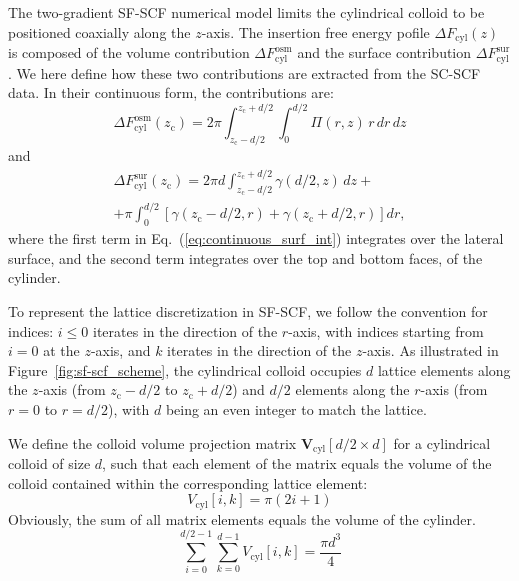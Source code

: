 \documentclass[10pt, a4paper]{article}
\begin{document}
\begin{multicols}{2}

The two-gradient SF-SCF numerical model limits the cylindrical colloid to be positioned coaxially along the $z$-axis.
The insertion free energy pofile $\Delta F_{\text{cyl}}(z)$ is composed of the volume contribution $\Delta F_{\text{cyl}}^{\text{osm}}$ and the surface contribution $\Delta F_{\text{cyl}}^{\text{sur}}$.
We here define how these two contributions are extracted from the SC-SCF data.
In their continuous form, the contributions are:
\begin{equation}
    \Delta F_{\text{cyl}}^{\text{osm}}(z_{\text{c}}) = 2 \pi \int_{z_{\text{c}} - d/2}^{z_{\text{c}} + d/2} \int_{0}^{d/2} \Pi(r,z) \, r \, dr \, dz
\end{equation}
and
\begin{equation}\label{eq:continuous_surf_int}
    \begin{aligned}
        \Delta F_{\text{cyl}}^{\text{sur}}(z_{\text{c}}) = 2 \pi d \int_{z_{\text{c}} - d/2}^{z_{\text{c}} + d/2} \gamma(d/2,z) \, dz +\\
        + \pi \int_{0}^{d/2} \left[ \gamma(z_{\text{c}} - d/2, r) + \gamma(z_{\text{c}} + d/2,r) \right] dr,
    \end{aligned}
\end{equation}
where the first term in Eq.~(\ref{eq:continuous_surf_int}) integrates over the lateral surface, and the second term integrates over the top and bottom faces, of the cylinder.

To represent the lattice discretization in SF-SCF, we follow the convention for indices: $i \le 0$ iterates in the direction of the $r$-axis, with indices starting from $i=0$ at the $z$-axis, and $k$ iterates in the direction of the $z$-axis.
As illustrated in Figure~\ref{fig:sf-scf_scheme}, the cylindrical colloid occupies $d$ lattice elements along the $z$-axis (from $z_{\text{c}} - d/2$ to $z_{\text{c}} + d/2$) and $d/2$ elements along the $r$-axis (from $r = 0$ to $r = d/2$), with $d$ being an even integer to match the lattice.

We define the colloid volume projection matrix $\bm{V}_{\text{cyl}}[d/2 \times d]$ for a cylindrical colloid of size $d$, such that each element of the matrix equals the volume of the colloid contained within the corresponding lattice element:
\begin{equation}
    V_{\text{cyl}}[i, k] = \pi(2i + 1)
\end{equation}
Obviously, the sum of all matrix elements equals the volume of the cylinder.
\begin{equation}
    \sum_{i=0}^{d/2 - 1} \sum_{k=0}^{d - 1} V_{\text{cyl}}[i, k] = \frac{\pi d^3}{4}
\end{equation}


\end{multicols}
\end{document}
